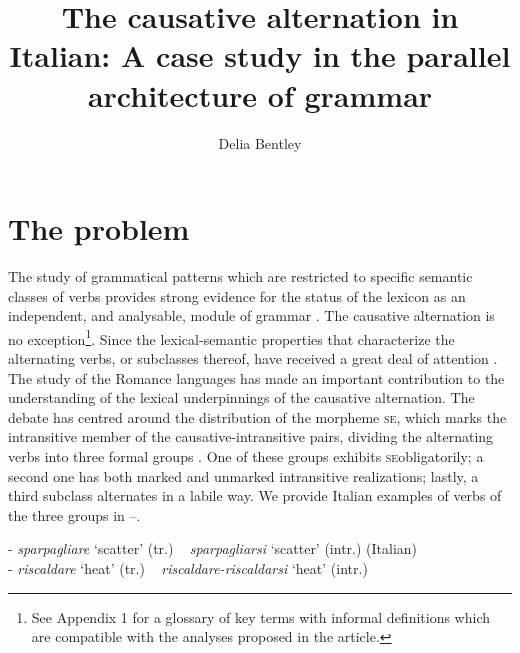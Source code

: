 \documentclass[output=paper,colorlinks,citecolor=brown
]{langscibook}
\author{Delia Bentley\orcid{}\affiliation{University of Manchester}}
\title[The causative alternation in Italian]{The causative alternation in Italian: A case study in the parallel architecture of grammar}
\begin{document}
\maketitle


\section{The problem}
\label{bentley_section_1}
The study of grammatical patterns which are restricted to specific semantic classes of verbs provides strong evidence for the status of the lexicon as an independent, and analysable, module of grammar \citep{pinker1989learnability,pinker2013secret,levin1993english}. The causative alternation is no exception\footnote{See Appendix 1 for a glossary of key terms with informal definitions which are compatible with the analyses proposed in the article.}.  Since \citet[332–337]{jespersen1927modern} the lexical-semantic properties that characterize the alternating verbs, or subclasses thereof, have received a great deal of attention \citep[etc.]{haspelmath1993more,levin1995unaccusativity,kiparsky1997remarks,chierchia1989semantics,comrie2006transitivity,schafer2009causative,samardzic2012meaning}. The study of the Romance languages has made an important contribution to the understanding of the lexical underpinnings of the causative alternation. The debate has centred around the distribution of the morpheme \textsc{se}, which marks the intransitive member of the causative-intransitive pairs, dividing the alternating verbs into three formal groups \citep[etc.]{zribi1987reflexivite,labelle1992change,alexiadou2006properties, alexiadou2015external, legendre2010french,cennamo2011anticausative,cennamo2012aspectual,kailuweit2012construcciones,martin2014anticausatives,vivanco2021scalar}. One of these groups exhibits \textsc{se}obligatorily; a second one has both marked and unmarked intransitive realizations; lastly, a third subclass alternates in a labile way. We provide Italian examples of verbs of the three groups in --.

\ea
\label{bentley_example_1}
\ea	\label{bentley_example_1a}  - \textit{sparpagliare} ‘scatter’ (tr.) ~ \textit{sparpagliarsi} ‘scatter’ (intr.) 	(Italian) \\

\ex	\label{bentley_example_1b} 
 - \textit{riscaldare} ‘heat’ (tr.) ~ \textit{riscaldare-riscaldarsi} ‘heat’ (intr.)  \\
\end{document}
